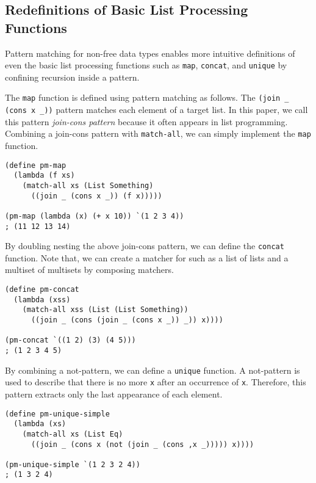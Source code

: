 \documentclass[acmlarge]{acmart}
\begin{document}
\subsection{Redefinitions of Basic List Processing Functions}

Pattern matching for non-free data types enables more intuitive definitions of even the basic list processing functions such as \texttt{map}, \texttt{concat}, and \texttt{unique} by confining recursion inside a pattern.

The \texttt{map} function is defined using pattern matching as follows.
The \texttt{(join _ (cons x _))} pattern matches each element of a target list.
In this paper, we call this pattern \emph{join-cons pattern} because it often appears in list programming.
Combining a join-cons pattern with \texttt{match-all}, we can simply implement the \texttt{map} function.

\begin{lstlisting}[language=egison]
(define pm-map
  (lambda (f xs)
    (match-all xs (List Something)
      ((join _ (cons x _)) (f x)))))

(pm-map (lambda (x) (+ x 10)) `(1 2 3 4))
; (11 12 13 14)
\end{lstlisting}

\noindent By doubling nesting the above join-cons pattern, we can define the \texttt{concat} function.
Note that, we can create a matcher for such as a list of lists and a multiset of multisets by composing matchers.

\begin{lstlisting}[language=egison]
(define pm-concat
  (lambda (xss)
    (match-all xss (List (List Something))
      ((join _ (cons (join _ (cons x _)) _)) x))))

(pm-concat `((1 2) (3) (4 5)))
; (1 2 3 4 5)
\end{lstlisting}

\noindent By combining a not-pattern, we can define a \texttt{unique} function.
A not-pattern is used to describe that there is no more \texttt{x} after an occurrence of \texttt{x}.
Therefore, this pattern extracts only the last appearance of each element.

\begin{lstlisting}[language=egison]
(define pm-unique-simple
  (lambda (xs)
    (match-all xs (List Eq)
      ((join _ (cons x (not (join _ (cons ,x _))))) x))))

(pm-unique-simple `(1 2 3 2 4))
; (1 3 2 4)
\end{lstlisting}
\end{document}
